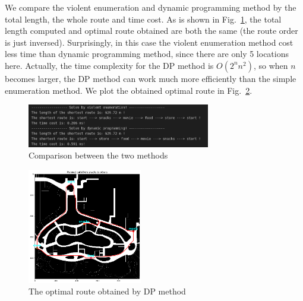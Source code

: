 \documentclass[hyperref]{article}
\theoremstyle{nonumberplain}
\begin{document}
We compare the violent enumeration and dynamic programming method by the total length, the whole route and time cost. As is shown in Fig.~\ref{fig5}, the total length computed and optimal route obtained are both the same (the route order is just inversed). Surprisingly, in this case the violent enumeration method cost less time than dynamic programming method, since there are only 5 locations here. Actually, the time complexity for the DP method is $O(2^{n}n^{2})$, so when $n$ becomes larger, the DP method can work much more efficiently than the simple enumeration method. We plot the obtained optimal route in Fig.~\ref{fig6}. 

 
\begin{figure}[H]
		\centering
		\includegraphics[width=8cm]{compare.png}
	\caption{Comparison between the two methods}
	\label{fig5}
\end{figure}

\begin{figure}[H]
	\centering
	\includegraphics[width=5cm]{optimal_route.png}
	\caption{The optimal route obtained by DP method}
	\label{fig6}
\end{figure}

\newpage

%	
%	





	
\end{document}

